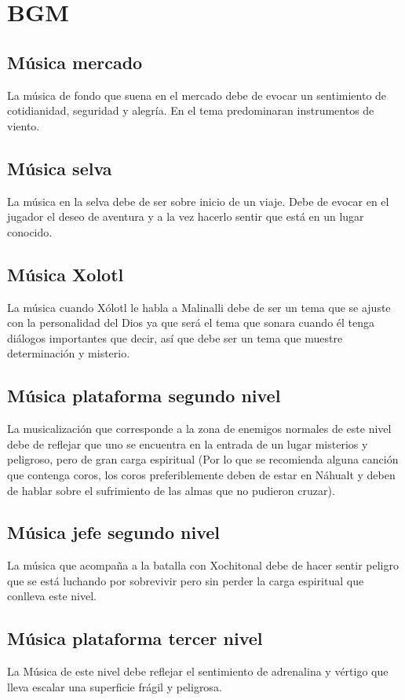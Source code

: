 \section{BGM}
\subsection{Música  mercado}\label{Musica:N01_ZN01}
La música de fondo que suena en el mercado debe de evocar un sentimiento de cotidianidad, seguridad y alegría. En el tema predominaran instrumentos de viento. 		
\subsection{Música  selva}\label{Musica:N01_ZN02}
La música en la selva debe de ser sobre inicio de un viaje. Debe de evocar en el jugador el deseo de aventura y a la vez hacerlo sentir que está en un lugar conocido.
\subsection{Música  Xolotl} \label{Musica:Xolotl}
La música cuando Xólotl le habla a Malinalli debe de ser un tema que se ajuste con la personalidad del Dios ya que será el tema que sonara cuando él tenga diálogos importantes que decir, así que debe ser un tema que muestre determinación y misterio.
\subsection{Música plataforma segundo nivel}\label{Musica:N02_ZN01}
La musicalización que corresponde a la zona de enemigos normales de este nivel debe de reflejar que uno se encuentra en la entrada de un lugar misterios y peligroso, pero de gran carga espiritual (Por lo que se recomienda alguna canción que contenga coros, los coros preferiblemente deben de estar en Náhualt y deben de hablar sobre el sufrimiento de las almas que no pudieron cruzar).
\subsection{Música jefe segundo nivel}\label{Musica:N02_ZN02}
La música que acompaña a la batalla con Xochitonal debe de hacer sentir peligro que se está luchando por sobrevivir pero sin perder la carga espiritual que conlleva este nivel. 
\subsection{Música plataforma tercer nivel} \label{Musica:N03_ZN01}
La Música  de este nivel debe reflejar el sentimiento de adrenalina y vértigo que lleva escalar una superficie frágil y peligrosa.
